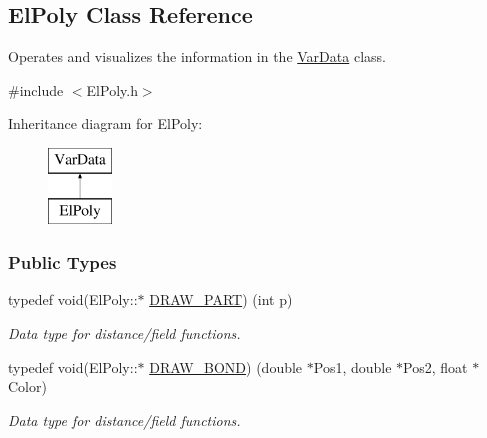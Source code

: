 \hypertarget{classElPoly}{}\subsection{El\+Poly Class Reference}
\label{classElPoly}


Operates and visualizes the information in the \hyperlink{classVarData}{Var\+Data} class.  




{\ttfamily \#include $<$El\+Poly.\+h$>$}

Inheritance diagram for El\+Poly\+:\begin{figure}[H]
\begin{center}
\leavevmode
\includegraphics[height=2.000000cm]{classElPoly}
\end{center}
\end{figure}
\subsubsection*{Public Types}
\begin{DoxyCompactItemize}
\item 
typedef void(El\+Poly\+::$\ast$ \hyperlink{classElPoly_a7585cd93a8e979d9e6ee801bf63f3faa}{D\+R\+A\+W\+\_\+\+P\+A\+RT}) (int p)\hypertarget{classElPoly_a7585cd93a8e979d9e6ee801bf63f3faa}{}\label{classElPoly_a7585cd93a8e979d9e6ee801bf63f3faa}

\begin{DoxyCompactList}\small\item\em Data type for distance/field functions. \end{DoxyCompactList}\item 
typedef void(El\+Poly\+::$\ast$ \hyperlink{classElPoly_a38f050e6c22f58efb8582b7874f11193}{D\+R\+A\+W\+\_\+\+B\+O\+ND}) (double $\ast$Pos1, double $\ast$Pos2, float $\ast$Color)\hypertarget{classElPoly_a38f050e6c22f58efb8582b7874f11193}{}\label{classElPoly_a38f050e6c22f58efb8582b7874f11193}

\begin{DoxyCompactList}\small\item\em Data type for distance/field functions. \end{DoxyCompactList}\end{DoxyCompactItemize}
